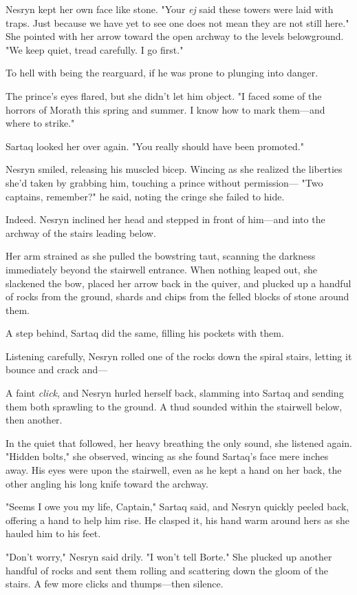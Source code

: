 Nesryn kept her own face like stone.
"Your \emph{ej} said these towers were laid with traps.
Just because we have yet to see one does not mean they are not still here."
She pointed with her arrow toward the open archway to the levels belowground.
"We keep quiet, tread carefully.
I go first."

To hell with being the rearguard, if he was prone to plunging into danger.

The prince's eyes flared, but she didn't let him object.
"I faced some of the horrors of Morath this spring and summer.
I know how to mark them---and where to strike."

Sartaq looked her over again.
"You really should have been promoted."

Nesryn smiled, releasing his muscled bicep.
Wincing as she realized the liberties she'd taken by grabbing him, touching a prince without permission--- "Two captains, remember?"
he said, noting the cringe she failed to hide.

Indeed.
Nesryn inclined her head and stepped in front of him---and into the archway of the stairs leading below.

Her arm strained as she pulled the bowstring taut, scanning the darkness immediately beyond the stairwell entrance.
When nothing leaped out, she slackened the bow, placed her arrow back in the quiver, and plucked up a handful of rocks from the ground, shards and chips from the felled blocks of stone around them.

A step behind, Sartaq did the same, filling his pockets with them.

Listening carefully, Nesryn rolled one of the rocks down the spiral stairs, letting it bounce and crack and---

A faint \emph{click}, and Nesryn hurled herself back, slamming into Sartaq and sending them both sprawling to the ground.
A thud sounded within the stairwell below, then another.

In the quiet that followed, her heavy breathing the only sound, she listened again.
"Hidden bolts," she observed, wincing as she found Sartaq's face mere inches away.
His eyes were upon the stairwell, even as he kept a hand on her back, the other angling his long knife toward the archway.

"Seems I owe you my life, Captain," Sartaq said, and Nesryn quickly peeled back, offering a hand to help him rise.
He clasped it, his hand warm around hers as she hauled him to his feet.

"Don't worry," Nesryn said drily.
"I won't tell Borte."
She plucked up another handful of rocks and sent them rolling and scattering down the gloom of the stairs.
A few more clicks and thumps---then silence.

